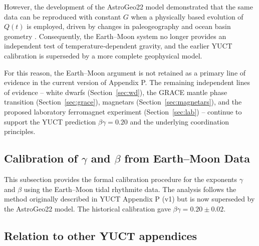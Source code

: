 \documentclass[12pt]{article}
\theoremstyle{remark}
\begin{document}
	However, the development of the AstroGeo22 model \cite{Farhat2022} demonstrated that the same data can be reproduced with constant \(G\) when a physically based evolution of \(Q(t)\) is employed, driven by changes in paleogeography and ocean basin geometry \cite{Zeeden2023}. Consequently, the Earth–Moon system no longer provides an independent test of temperature‑dependent gravity, and the earlier YUCT calibration is superseded by a more complete geophysical model.
	
	For this reason, the Earth–Moon argument is not retained as a primary line of evidence in the current version of Appendix P. The remaining independent lines of evidence – white dwarfs (Section~\ref{sec:wd}), the GRACE mantle phase transition (Section~\ref{sec:grace}), magnetars (Section~\ref{sec:magnetars}), and the proposed laboratory ferromagnet experiment (Section~\ref{sec:lab}) – continue to support the YUCT prediction \(\beta\gamma = 0.20\) and the underlying coordination principles.
	
	\subsection{Calibration of $\gamma$ and $\beta$ from Earth–Moon Data}\label{subsec:earth-moon-calibration}
	This subsection provides the formal calibration procedure for the exponents \(\gamma\) and \(\beta\) using the Earth–Moon tidal rhythmite data. The analysis follows the method originally described in YUCT Appendix P (v1) but is now superseded by the AstroGeo22 model. The historical calibration gave \(\beta\gamma = 0.20 \pm 0.02\).
	
	\subsection{Relation to other YUCT appendices}
	
\end{document}
